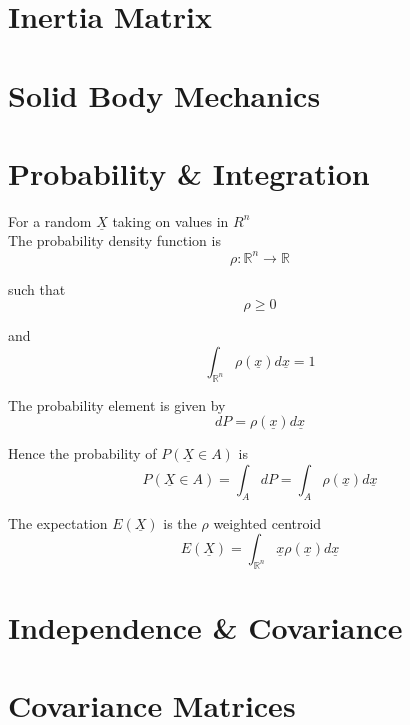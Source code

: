 \section{Inertia Matrix}
\section{Solid Body Mechanics}
\section{Probability \& Integration}

For a random $ \underline{X}$ taking on values in $R^n$ \\

The probability density function is 
\[
  \rho : \mathbb{R}^n \rightarrow \mathbb{R}
\] 

such that
\[
  \rho \geq 0
\] 

and 
\[
   \int_{ \mathbb{R}^n}  \rho ( \underline{x}) d \underline{x} = 1
\] 

The probability element is given by
\[
  dP = \rho ( \underline{x }) d \underline{x}
\] 

Hence the probability of $P( \underline{X} \in A)$ is 
 \[
  P( \underline{X} \in A) = \int_A dP = \int_A \rho ( \underline{x}) d \underline{x}
\] 

The expectation $E ( \underline{X}) $ is the $\rho$ weighted centroid 
\[
   E( \underline{X}) = \int_{ \mathbb{R}^n} \underline{x} \rho ( \underline{x}) d \underline{x}
\]  


\section{Independence \& Covariance}
\section{Covariance Matrices}

